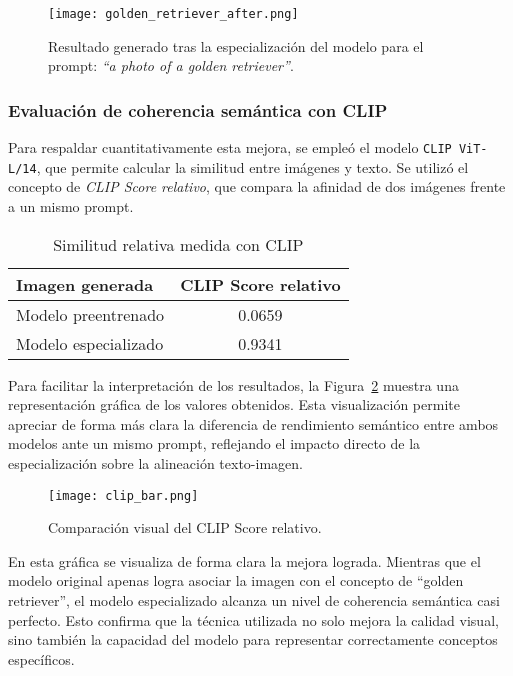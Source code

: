 \begin{figure}[H]
    \centering
    \texttt{[image: golden\_retriever\_after.png]}
    \caption{Resultado generado tras la especialización del modelo para el prompt: \textit{``a photo of a golden retriever''}.}
    \label{fig:golden-after}
\end{figure}

\subsubsection{Evaluación de coherencia semántica con CLIP}

Para respaldar cuantitativamente esta mejora, se empleó el modelo \texttt{CLIP ViT-L/14}, que permite calcular la similitud entre imágenes y texto. Se utilizó el concepto de \textit{CLIP Score relativo}, que compara la afinidad de dos imágenes frente a un mismo prompt.

\begin{table}[H]
\centering
\renewcommand{\arraystretch}{1.5}
\begin{tabular}{|p{6cm}|c|}
\hline
\rowcolor{gray!30}
\textbf{Imagen generada} & \textbf{CLIP Score relativo} \\
\hline
Modelo preentrenado & 0.0659 \\
\hline
Modelo especializado & 0.9341 \\
\hline
\end{tabular}
\caption{Similitud relativa medida con CLIP}
\label{tab:clip-golden}
\end{table}

Para facilitar la interpretación de los resultados, la Figura~\ref{fig:clip_bar} muestra una representación gráfica de los valores obtenidos. Esta visualización permite apreciar de forma más clara la diferencia de rendimiento semántico entre ambos modelos ante un mismo prompt, reflejando el impacto directo de la especialización sobre la alineación texto-imagen.

\begin{figure}[H]
    \centering
    \texttt{[image: clip\_bar.png]}
    \caption{Comparación visual del CLIP Score relativo.}
    \label{fig:clip_bar}
\end{figure}

En esta gráfica se visualiza de forma clara la mejora lograda. Mientras que el modelo original apenas logra asociar la imagen con el concepto de ``golden retriever'', el modelo especializado alcanza un nivel de coherencia semántica casi perfecto. Esto confirma que la técnica utilizada no solo mejora la calidad visual, sino también la capacidad del modelo para representar correctamente conceptos específicos.

